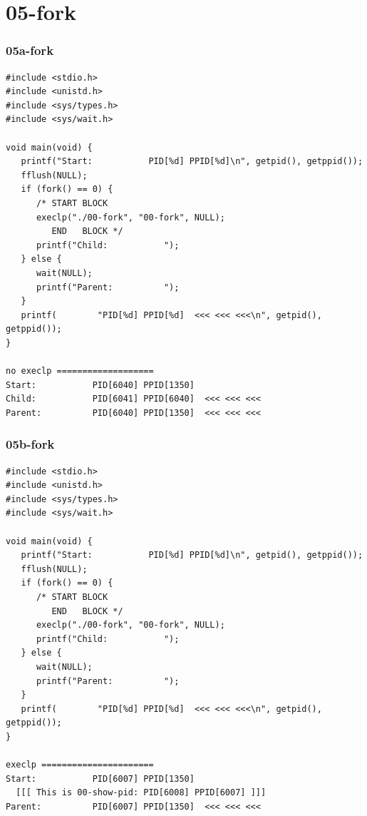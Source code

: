 \documentclass[aspectratio=169, xcolor=table, notheorems, hyperref={pdfpagelabels=false}]{beamer}
\begin{document}
\section{05-fork}
\begin{frame}[fragile]
\frametitle{05a-fork}
\begin{lstlisting}[basicstyle=\ttfamily\tiny]
#include <stdio.h>
#include <unistd.h>
#include <sys/types.h>
#include <sys/wait.h>

void main(void) {
   printf("Start:           PID[%d] PPID[%d]\n", getpid(), getppid());
   fflush(NULL);
   if (fork() == 0) {
      /* START BLOCK
      execlp("./00-fork", "00-fork", NULL);
         END   BLOCK */
      printf("Child:           ");
   } else {
      wait(NULL);
      printf("Parent:          ");
   }
   printf(        "PID[%d] PPID[%d]  <<< <<< <<<\n", getpid(), getppid());
}

no execlp ===================
Start:           PID[6040] PPID[1350]
Child:           PID[6041] PPID[6040]  <<< <<< <<<
Parent:          PID[6040] PPID[1350]  <<< <<< <<<

\end{lstlisting}
\end{frame}

\begin{frame}[fragile]
\frametitle{05b-fork}
\begin{lstlisting}[basicstyle=\ttfamily\tiny]
#include <stdio.h>
#include <unistd.h>
#include <sys/types.h>
#include <sys/wait.h>

void main(void) {
   printf("Start:           PID[%d] PPID[%d]\n", getpid(), getppid());
   fflush(NULL);
   if (fork() == 0) {
      /* START BLOCK
         END   BLOCK */
      execlp("./00-fork", "00-fork", NULL);
      printf("Child:           ");
   } else {
      wait(NULL);
      printf("Parent:          ");
   }
   printf(        "PID[%d] PPID[%d]  <<< <<< <<<\n", getpid(), getppid());
}

execlp ======================
Start:           PID[6007] PPID[1350]
  [[[ This is 00-show-pid: PID[6008] PPID[6007] ]]]
Parent:          PID[6007] PPID[1350]  <<< <<< <<<

\end{lstlisting}
\end{frame}
\end{document}
